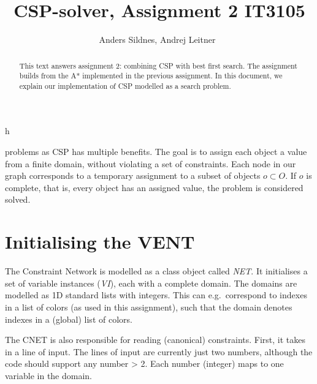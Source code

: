 \documentclass[journal]{IEEEtran}
\begin{document}
%
\title{CSP-solver, Assignment 2 IT3105}

\author{Anders Sildnes, Andrej Leitner~%
}%

%
{h}

\maketitle

\begin{abstract}
    This text answers assignment 2: combining CSP with best first search.
    The assignment builds from the A* implemented in the previous assignment.
    In this document,
    we explain our implementation of CSP modelled as a search problem.

\end{abstract}

 problems as CSP has multiple benefits.
The goal is to assign each object a value from a finite domain,
without violating a set of constraints. 
Each node in our graph corresponds to a temporary assignment
to a subset of objects $o \subset O$. If $o$  is complete, that is, every object
has an assigned value, the problem is considered solved.

\section{Initialising the VENT}
The Constraint Network is modelled as a class object called \textit{NET}.
It initialises a set of variable instances (\textit{VI}), each with
a complete domain. The domains are modelled as 1D standard lists with integers.
This can e.g.\ correspond to indexes in a list of 
colors (as used in this assignment), such that the domain denotes
indexes in a (global) list of colors.

The CNET is also responsible for reading (canonical) constraints.
First, it takes in a line of input. The lines of input
are currently just two numbers, although the code should support 
any number \textgreater{} 2. Each number (integer) maps to one variable in the
domain. 
\end{document}
